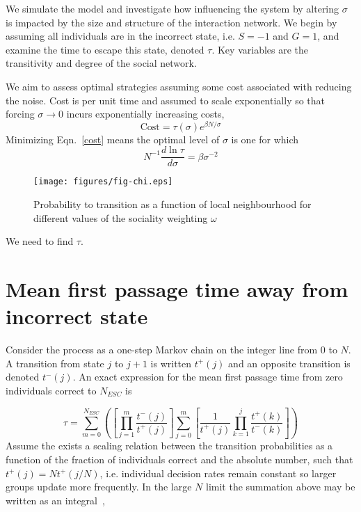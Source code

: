 \documentclass[3p,number,sort&compress,times]{elsarticle}
\begin{document}
We simulate the model and investigate how influencing the system by altering $\sigma$ is impacted by the size and structure of the interaction network. We begin by assuming all individuals are in the incorrect state, i.e. $S=-1$ and $G=1$, and examine the time to escape this state, denoted $\tau$. Key variables are the transitivity and degree of the social network.

We aim to assess optimal strategies assuming some cost associated with reducing the noise. Cost is per unit time and assumed to scale exponentially so that forcing $\sigma \rightarrow 0$ incurs exponentially increasing costs,
\begin{equation}
\mbox{Cost} = \tau (\sigma) e^{\beta N/\sigma}
\label{cost}
\end{equation}
Minimizing Eqn.~\ref{cost} means the optimal level of $\sigma$ is one for which
\begin{equation}
N^{-1} \frac{d \ln \tau}{d \sigma} = \beta \sigma^{-2}
\end{equation}
\begin{figure*}
\centering
\texttt{[image: figures/fig-chi.eps]} 
\caption{Probability to transition as a function of local neighbourhood for different values of the sociality weighting $\omega$}
\label{fig1}
\end{figure*}
We need to find $\tau$.
\section{Mean first passage time away from incorrect state}
Consider the process as a one-step Markov chain on the integer line from $0$ to $N$. A transition from state $j$ to $j+1$ is written $t^+(j)$ and an opposite transition is denoted $t^-(j)$. An exact expression for the mean first passage time from zero individuals correct to $N_{ESC}$ is \cite{gardiner}

\begin{equation}
\tau = \sum\limits_{m=0}^{N_{ESC}} \left( \left[ \prod\limits_{j=1}^{m} \frac{t^-(j)}{t^+(j)} \right] \sum\limits_{j=0}^{m} \left[\frac{1}{t^+(j)} \prod\limits_{k=1}^{j} \frac{t^+(k)}{t^-(k)}  \right]   \right)
\label{noapprox1}
\end{equation}
Assume the exists a scaling relation between the transition probabilities as a function of the fraction of individuals correct and the absolute number, such that $t^+(j) = N t^+(j/N)$, i.e. individual decision rates remain constant so larger groups update more frequently. In the large $N$ limit the summation above may be written as an integral~\cite{doering}, 
\end{document}
